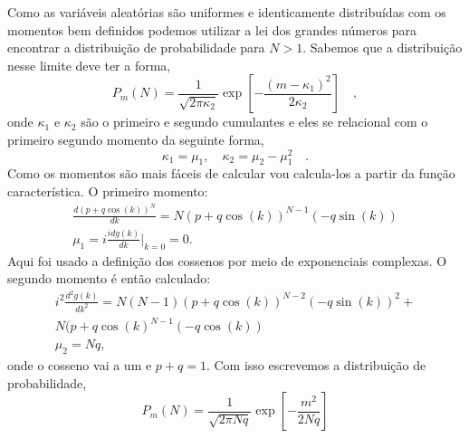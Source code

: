 \documentclass[12pt]{article}
\begin{document}
Como as variáveis aleatórias são uniformes e identicamente distribuídas com os momentos bem definidos podemos utilizar a lei dos grandes números para encontrar a distribuição de probabilidade para $N > 1$. Sabemos que a distribuição nesse limite deve ter a forma,
\begin{equation}
P_m(N) = \frac{1}{\sqrt{2\pi \kappa_2}}\exp{\left[-\frac{(m-\kappa_1)^2}{2\kappa_2}\right]} \quad ,
\end{equation}
onde $\kappa_1$ e $\kappa_2$ são o primeiro e segundo cumulantes e eles se relacional com o primeiro segundo momento da seguinte forma,
\begin{equation}
\kappa_1 = \mu_1, \quad \kappa_2 = \mu_2 - \mu_1^2\quad. 
\end{equation}
Como os momentos são mais fáceis de calcular vou calcula-los a partir da função característica. O primeiro momento:
\begin{equation}
\begin{split}
\frac{d(p + q\cos(k))^N}{dk} = N(p + q\cos(k))^{N-1}(-q\sin(k))\\
\mu_1 = i\frac{idg(k)}{dk}\Big\rvert_{k=0} = 0. 
\end{split}
\end{equation}
Aqui foi usado a definição dos cossenos por meio de exponenciais complexas. O segundo momento é então calculado:
\begin{equation}
\begin{split}
i^2\frac{d^2g(k)}{dk^2} =  N(N-1)(p + q\cos(k))^{N-2}(-q\sin(k))^2 +\\
N(p + q\cos(k)^{N-1}(-q\cos(k))\\
\mu_2 = Nq,
\end{split}
\end{equation}
onde o cosseno vai a um e $p+q=1$. 
Com isso escrevemos a distribuição de probabilidade,
\begin{equation}
P_m(N) = \frac{1}{\sqrt{2\pi Nq}}\exp{\left[-\frac{m^2}{2Nq}\right]}
\end{equation}
\end{document}
